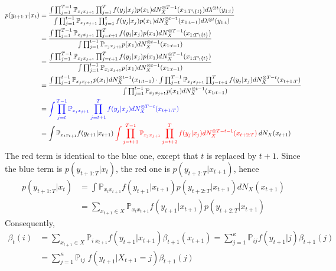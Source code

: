\documentclass[a4paper,11pt, hidelinks]{article}
\begin{document}
\begin{enumerate}[label=(\alph*)]
	$$\begin{aligned}
		p(y_{t+1:T}|x_t) &= \frac{\int \prod_{j=1}^{T-1}\mathbb P_{x_{j} x_{j+1}} \prod_{j=1}^{T}f(y_j|x_j)p(x_1) dN_X^{\otimes T-1}(x_{1:T\setminus \{t\}}) d\lambda^{\otimes t}(y_{1:t})}{\int \prod_{j=1}^{t-1}\mathbb P_{x_{j} x_{j+1}} \prod_{j=1}^{t}f(y_j|x_j)p(x_1) dN_X^{\otimes t-1}(x_{1:t-1}) d\lambda^{\otimes t}(y_{1:t})}\\
		&= \frac{\int \prod_{j=1}^{T-1}\mathbb P_{x_{j} x_{j+1}} \prod_{j=t+1}^{T}f(y_j|x_j)p(x_1) dN_X^{\otimes T-1}(x_{1:T\setminus \{t\}}) }{\int \prod_{j=1}^{t-1}\mathbb P_{x_{j} x_{j+1}}p(x_1) dN_X^{\otimes t-1}(x_{1:t-1})}\\
		&= \frac{\int \prod_{j=1}^{T-1}\mathbb P_{x_{j} x_{j+1}} \prod_{j=t+1}^{T}f(y_j|x_j)p(x_1) dN_X^{\otimes T-1}(x_{1:T\setminus \{t\}}) }{\int \prod_{j=1}^{t-1}\mathbb P_{x_{j} x_{j+1}}p(x_1) dN_X^{\otimes t-1}(x_{1:t-1})}\\
		&= \frac{\int \prod_{j=1}^{t-1}\mathbb P_{x_{j} x_{j+1}}p(x_1) dN_X^{\otimes t-1}(x_{1:t-1}) \cdot \int \prod_{j=t}^{T-1}\mathbb P_{x_{j} x_{j+1}} \prod_{j=t+1}^{T}f(y_j|x_j) dN_X^{\otimes T-t}(x_{t+1:T}) }{\int \prod_{j=1}^{t-1}\mathbb P_{x_{j} x_{j+1}} p(x_1)dN_X^{\otimes t-1}(x_{1:t-1})}\\
		&= \mathbin{\textcolor{blue}{\int \prod_{j=t}^{T-1}\mathbb P_{x_{j} x_{j+1}} \prod_{j=t+1}^{T}f(y_j|x_j) dN_X^{\otimes T-t}(x_{t+1:T})}} \\
		&= \int \mathbb P_{x_t x_{t+1}}f(y_{t+1}|x_{t+1}) \mathbin{\textcolor{red}{\int \prod_{j=t+1}^{T-1}\mathbb P_{x_{j} x_{j+1}} \prod_{j=t+2}^{T}f(y_j|x_j) dN_X^{\otimes T-t-1}(x_{t+2:T})}} dN_X(x_{t+1})
	\end{aligned} $$
	The red term is identical to the blue one, except that $t$ is replaced by $t+1$. Since the blue term is $p(y_{t+1:T}|x_t)$, the red one is $p(y_{t+2:T}|x_{t+1})$, hence 
	$$\begin{aligned}
	p(y_{t+1:T}|x_t) &= \int \mathbb P_{x_t x_{t+1}}f(y_{t+1}|x_{t+1}) p(y_{t+2:T}|x_{t+1}) dN_X(x_{t+1}) \\
	&= \sum_{x_{t+1}\in X} \mathbb P_{x_t x_{t+1}}f(y_{t+1}|x_{t+1}) p(y_{t+2:T}|x_{t+1})
	\end{aligned}
	$$
	Consequently, $$\begin{aligned}
	\beta_t(i) &= \sum_{x_{t+1}\in X} \mathbb P_{i\;x_{t+1}}f(y_{t+1}|x_{t+1}) \beta_{t+1}(x_{t+1})
	= \sum_{j=1}^{\kappa} \mathbb P_{ij}f(y_{t+1}|j) \beta_{t+1}(j)\\
	&= \sum_{j=1}^{\kappa} \mathbb P_{ij} \;f(y_{t+1}|X_{t+1} = j) \beta_{t+1}(j)

\end{aligned}$$
\end{enumerate}
\end{document}
